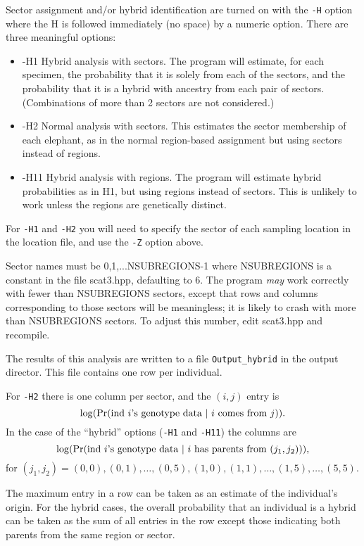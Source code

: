 \documentclass[10pt,titlepage,times,letterpaper]{article}
\def \Pr{{\rm Pr}}
\begin{document}
Sector assignment and/or hybrid identification are
turned on with the {\tt -H} option where the H is
followed immediately (no space) by a numeric option.  There are three
meaningful options:

\begin{itemize}
\item -H1 Hybrid analysis with sectors.  The program will estimate,
for each specimen, the probability that it is solely from each of the
sectors, and the probability that it is a hybrid with ancestry from
each pair of sectors.  (Combinations of more than 2 sectors are
not considered.)
\item -H2  Normal analysis with sectors.   This estimates the
sector membership of each elephant, as in the normal region-based
assignment but using sectors instead of regions.  
\item -H11 Hybrid analysis with regions.  The program will estimate 
hybrid probabilities as in H1, but using regions instead of sectors.  
This is unlikely to work unless the regions are genetically distinct.
\end{itemize}

For {\tt -H1} and {\tt -H2} you will need to specify the sector of
each sampling location in the location file, and use the {\tt -Z} option above. 

Sector names must be 0,1,...NSUBREGIONS-1 where NSUBREGIONS is a
constant in the file scat3.hpp, defaulting to 6.  The program {\it may}
work correctly with fewer than NSUBREGIONS sectors, except that 
rows and columns corresponding to those sectors will be meaningless; it
is likely to crash with more than NSUBREGIONS sectors.  To adjust this
number, edit scat3.hpp and recompile.

The results of this analysis are written to a file {\tt Output\_hybrid} in
the output director.  This file contains one row per individual.

For {\tt -H2} there is one column per sector, and the $(i,j)$ entry
is $$\log(\Pr(\text{ind $i$'s genotype data $\mid$ $i$ comes from $j$})).$$
In the case of the ``hybrid'' options ({\tt -H1} and {\tt -H11}) the columns are
$$\log(\Pr(\text{ind $i$'s genotype data $\mid$ $i$ has parents from $(j_1,j_2)$})),$$
for $(j_1,j_2) = (0,0), (0,1),\dots,(0,5),(1,0),(1,1),\dots,(1,5),\dots, (5,5)$.

The maximum entry in a row can be taken as an estimate of the individual's
origin.  For the hybrid cases, the overall probability that an individual is
a hybrid can be taken as the sum of all entries in the row except those indicating
both parents from the same region or sector.
\end{document}
